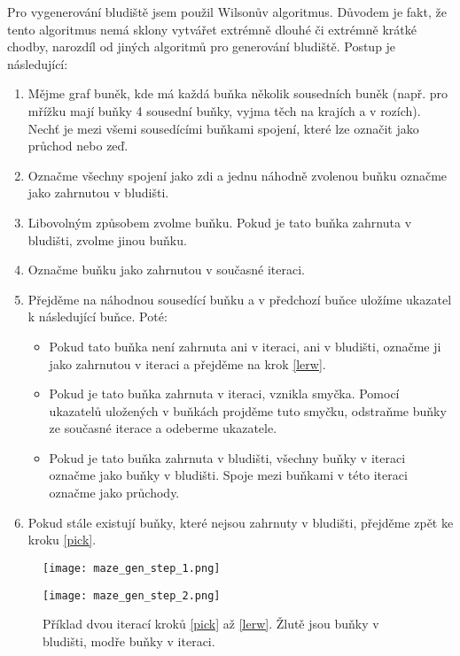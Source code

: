 Pro vygenerování bludiště jsem použil Wilsonův algoritmus. Důvodem je fakt, že tento algoritmus nemá sklony vytvářet extrémně dlouhé či extrémně krátké chodby, narozdíl od jiných algoritmů pro generování bludiště. Postup je následující:

\begin{enumerate}
  \setcounter{enumi}{0}
  \item Mějme graf buněk, kde má každá buňka několik sousedních buněk (např. pro mřížku mají buňky 4 sousední buňky, vyjma těch na krajích a v rozích). Nechť je mezi všemi sousedícími buňkami spojení, které lze označit jako průchod nebo zeď.
  \item Označme všechny spojení jako zdi a jednu náhodně zvolenou buňku označme jako zahrnutou v bludišti.
  \item Libovolným způsobem zvolme buňku. Pokud je tato buňka zahrnuta v bludišti, zvolme jinou buňku. \label{pick}
  \item Označme buňku jako zahrnutou v současné iteraci.
  \item Přejděme na náhodnou sousedící buňku a v předchozí buňce uložíme ukazatel k následující buňce. Poté: \label{lerw}
        \begin{itemize}
          \item Pokud tato buňka není zahrnuta ani v iteraci, ani v bludišti, označme ji jako zahrnutou v iteraci a přejděme na krok \ref{lerw}.
          \item Pokud je tato buňka zahrnuta v iteraci, vznikla smyčka. Pomocí ukazatelů uložených v buňkách projděme tuto smyčku, odstraňme buňky ze současné iterace a odeberme ukazatele.
          \item Pokud je tato buňka zahrnuta v bludišti, všechny buňky v iteraci označme jako buňky v bludišti. Spoje mezi buňkami v této iteraci označme jako průchody.
        \end{itemize}
  \item Pokud stále existují buňky, které nejsou zahrnuty v bludišti, přejděme zpět ke kroku \ref{pick}.
\end{enumerate}

\begin{figure}[H]
  \centering

  \begin{minipage}{.5\textwidth}
    \centering
    \texttt{[image: maze\_gen\_step\_1.png]}
  \end{minipage}%
  \begin{minipage}{.5\textwidth}
    \centering
    \texttt{[image: maze\_gen\_step\_2.png]}
  \end{minipage}

  \caption{Příklad dvou iterací kroků \ref{pick} až \ref{lerw}. Žlutě jsou buňky v bludišti, modře buňky v iteraci.}
\end{figure}

